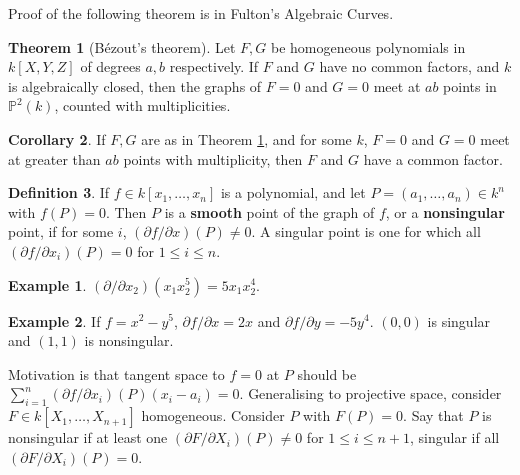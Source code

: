 \documentclass{article}
\renewcommand{\P}{\mathbb{P}}
\newcommand{\rb}[1]{\left( #1 \right)}
\renewcommand{\sb}[1]{\left[ #1 \right]}
\theoremstyle{definition}\newtheorem{definition}{Definition}[section]
\theoremstyle{definition}\newtheorem{remark}[definition]{Remark}
\theoremstyle{definition}\newtheorem*{example}{Example}
\theoremstyle{definition}\newtheorem*{note}{Note}
\newtheorem{theorem}[definition]{Theorem}
\newtheorem{corollary}[definition]{Corollary}
\begin{document}

Proof of the following theorem is in Fulton's Algebraic Curves.

\begin{theorem}[Bézout's theorem]
\label{thm:2.6}
Let $ F, G $ be homogeneous polynomials in $ k\sb{X, Y, Z} $ of degrees $ a, b $ respectively. If $ F $ and $ G $ have no common factors, and $ k $ is algebraically closed, then the graphs of $ F = 0 $ and $ G = 0 $ meet at $ ab $ points in $ \P^2\rb{k} $, counted with multiplicities.
\end{theorem}

\begin{corollary}
If $ F, G $ are as in Theorem \ref{thm:2.6}, and for some $ k $, $ F = 0 $ and $ G = 0 $ meet at greater than $ ab $ points with multiplicity, then $ F $ and $ G $ have a common factor.
\end{corollary}

\begin{definition}
If $ f \in k\sb{x_1, \dots, x_n} $ is a polynomial, and let $ P = \rb{a_1, \dots, a_n} \in k^n $ with $ f\rb{P} = 0 $. Then $ P $ is a \textbf{smooth} point of the graph of $ f $, or a \textbf{nonsingular} point, if for some $ i $, $ \rb{\partial f / \partial x}\rb{P} \ne 0 $. A singular point is one for which all $ \rb{\partial f / \partial x_i}\rb{P} = 0 $ for $ 1 \le i \le n $.
\end{definition}

\begin{example}
$ \rb{\partial / \partial x_2}\rb{x_1x_2^5} = 5x_1x_2^4 $.
\end{example}

\begin{example}
If $ f = x^2 - y^5 $, $ \partial f / \partial x = 2x $ and $ \partial f / \partial y = -5y^4 $. $ \rb{0, 0} $ is singular and $ \rb{1, 1} $ is nonsingular.
\end{example}

Motivation is that tangent space to $ f = 0 $ at $ P $ should be $ \sum_{i = 1}^n \rb{\partial f / \partial x_i}\rb{P}\rb{x_i - a_i} = 0 $. Generalising to projective space, consider $ F \in k\sb{X_1, \dots, X_{n + 1}} $ homogeneous. Consider $ P $ with $ F\rb{P} = 0 $. Say that $ P $ is nonsingular if at least one $ \rb{\partial F / \partial X_i}\rb{P} \ne 0 $ for $ 1 \le i \le n + 1 $, singular if all $ \rb{\partial F / \partial X_i}\rb{P} = 0 $.
\end{document}
